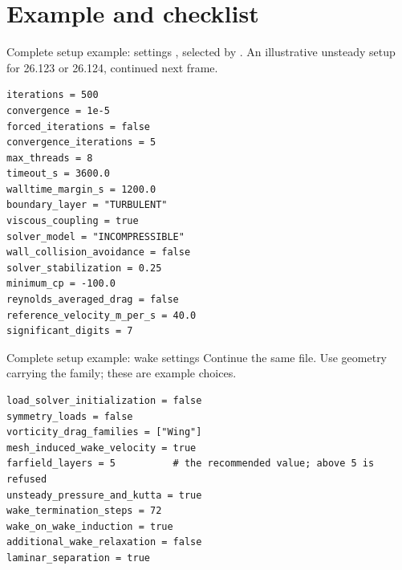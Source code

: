 %
\section{Example and checklist}

\begin{frame}[fragile]{Complete setup example: settings}
\small {}, selected by .
An illustrative unsteady setup for 26.123 or 26.124, continued next frame.
\begin{lstlisting}[basicstyle=\ttfamily\scriptsize,numbers=none]
iterations = 500
convergence = 1e-5
forced_iterations = false
convergence_iterations = 5
max_threads = 8
timeout_s = 3600.0
walltime_margin_s = 1200.0
boundary_layer = "TURBULENT"
viscous_coupling = true
solver_model = "INCOMPRESSIBLE"
wall_collision_avoidance = false
solver_stabilization = 0.25
minimum_cp = -100.0
reynolds_averaged_drag = false
reference_velocity_m_per_s = 40.0
significant_digits = 7
\end{lstlisting}
\end{frame}

\begin{frame}[fragile]{Complete setup example: wake settings}
\small Continue the same file. Use
geometry carrying the  family; these are example choices.
\begin{lstlisting}[basicstyle=\ttfamily\scriptsize,numbers=none]
load_solver_initialization = false
symmetry_loads = false
vorticity_drag_families = ["Wing"]
mesh_induced_wake_velocity = true
farfield_layers = 5          # the recommended value; above 5 is refused
unsteady_pressure_and_kutta = true
wake_termination_steps = 72
wake_on_wake_induction = true
additional_wake_relaxation = false
laminar_separation = true
\end{lstlisting}
\end{frame}

